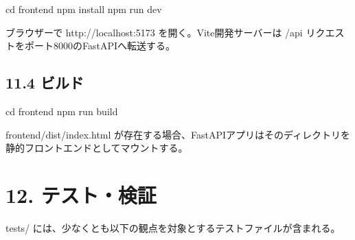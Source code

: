 \documentclass[
]{article}
\newenvironment{Shaded}{}{}
\newcommand{\NormalTok}[1]{#1}
\begin{document}
\begin{Shaded}
\begin{Highlighting}[]
\NormalTok{cd frontend}
\NormalTok{npm install}
\NormalTok{npm run dev}
\end{Highlighting}
\end{Shaded}

ブラウザーで http://localhost:5173 を開く。Vite開発サーバーは /api
リクエストをポート8000のFastAPIへ転送する。

\subsection{11.4 ビルド}\label{ux30d3ux30ebux30c9}

\begin{Shaded}
\begin{Highlighting}[]
\NormalTok{cd frontend}
\NormalTok{npm run build}
\end{Highlighting}
\end{Shaded}

frontend/dist/index.html
が存在する場合、FastAPIアプリはそのディレクトリを静的フロントエンドとしてマウントする。

\section{12. テスト・検証}\label{ux30c6ux30b9ux30c8ux691cux8a3c}

tests/ には、少なくとも以下の観点を対象とするテストファイルが含まれる。
\end{document}
